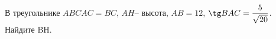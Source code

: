 \begin{ex}
	\begin{condition}
		В треугольнике \( ABC AC = BC \), \( AH – \) высота, \( AB=12 \),  \( \tg BAC=\dfrac{5}{\sqrt{20}} \).  Найдите BH.
	\end{condition}
\end{ex}